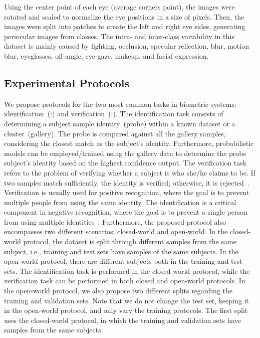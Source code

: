 \documentclass[journal]{IEEEtran}
\begin{document}
Using the center point of each eye (average corners point), the images were rotated and scaled to normalize the eye positions in a size of  pixels.
Then, the images were split into  patches to create the left and right eye sides, generating  periocular images from  classes.
The intra- and inter-class variability in this dataset is mainly caused by lighting, occlusion, specular reflection, blur, motion blur, eyeglasses, off-angle, eye-gaze, makeup, and facial expression.

\subsection{Experimental Protocols}
\label{sec:protocol}

We propose protocols for the two most common tasks in biometric systems: identification~(:) and verification~(:).
The identification task consists of determining a subject sample identity~(probe) within a known dataset or a cluster~(gallery).
The probe is compared against all the gallery samples, considering the closest match as the subject's identity.
Furthermore, probabilistic models can be employed/trained using the gallery data to determine the probe subject's identity based on the highest confidence output.
The verification task refers to the problem of verifying whether a subject is who she/he claims to be.
If two samples match sufficiently, the identity is verified; otherwise, it is rejected~\cite{bowyer2008survey}.
Verification is usually used for positive recognition, where the goal is to prevent multiple people from using the same identity.
The identification is a critical component in negative recognition, where the goal is to prevent a single person from using multiple identities~\cite{jain2008introbiometrics}.
Furthermore, the proposed protocol also encompasses two different scenarios: closed-world and open-world.
In the closed-world protocol, the dataset is split through different samples from the same subject, i.e., training and test sets have samples of the same subjects.
In the open-world protocol, there are different subjects both in the training and test sets.
The identification task is performed in the closed-world protocol, while the verification task can be performed in both closed and open-world protocols.
In the open-world protocol, we also propose two different splits regarding the training and validation sets.
Note that we do not change the test set, keeping it in the open-world protocol, and only vary the training protocols.
The first split uses the closed-world protocol, in which the training and validation sets have samples from the same subjects.
\end{document}
